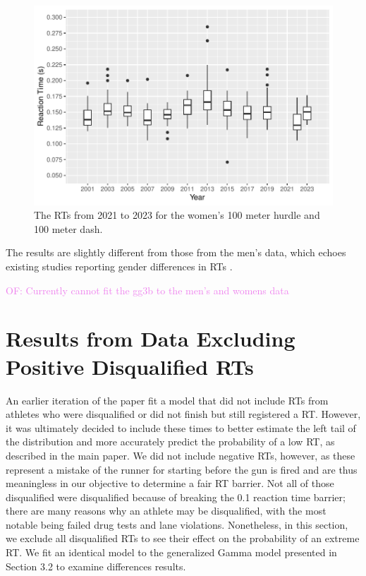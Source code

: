 \documentclass[12pt, letterpaper]{article}
\newcommand{\of}[1]{\textcolor{violet}{OF: #1}}
\begin{document}
\begin{figure}[tbp]
  \centering
  \includegraphics[width=\textwidth]{WomensBoxplot}
  \caption{The RTs from 2021 to 2023 for the women's 100 meter hurdle
  and 100 meter dash.}
  \label{fig:WomensBoxplot}
\end{figure}

The results are slightly different from those from the men's data,
which echoes existing studies reporting gender differences in RTs 
\citep[e.g.,][]{lipps2011implications, babicc2009reaction,
  panoutsakopoulos2020gender}.

\of{Currently cannot fit the gg3b to the men's and womens data}


\section{Results from Data Excluding Positive Disqualified RTs}

An earlier iteration of the paper fit a model that did not include RTs from
athletes who were disqualified or did not finish but still registered a RT.  
However, it was ultimately decided to include these times to better estimate the 
left tail of the distribution and more accurately predict the probability of a 
low RT, as described in the main paper.  
We did not include negative RTs, however, as these represent a mistake 
of the runner for starting before
the gun is fired and are thus meaningless in our objective to
determine a fair RT barrier.  Not all of those disqualified were
disqualified because of breaking the 0.1 reaction time barrier; there are many
reasons why an athlete may be disqualified, with the most notable being failed
drug tests and lane violations.  Nonetheless, in this section,
we exclude all disqualified RTs to see their effect on the probability of an
extreme RT.  We fit an identical model to the generalized Gamma model
presented in Section 3.2 to examine differences results.
\end{document}
